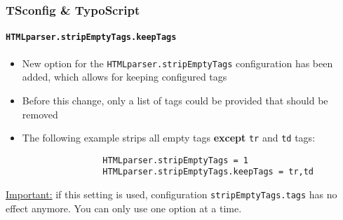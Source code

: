 \begin{frame}[fragile]
	\frametitle{TSconfig \& TypoScript}
	\framesubtitle{\texttt{HTMLparser.stripEmptyTags.keepTags}}

	\lstset{basicstyle=\tiny\ttfamily}

	\begin{itemize}

		\item New option for the \texttt{HTMLparser.stripEmptyTags} configuration has been added,
			which allows for keeping configured tags
		\item Before this change, only a list of tags could be provided that should be removed
		\item The following example strips all empty tags \textbf{except} \texttt{tr} and \texttt{td} tags:

			\begin{lstlisting}
				HTMLparser.stripEmptyTags = 1
				HTMLparser.stripEmptyTags.keepTags = tr,td
			\end{lstlisting}

	\end{itemize}

	\underline{Important:} if this setting is used, configuration \texttt{stripEmptyTags.tags}
		has no effect anymore. You can only use one option at a time.

\end{frame}

